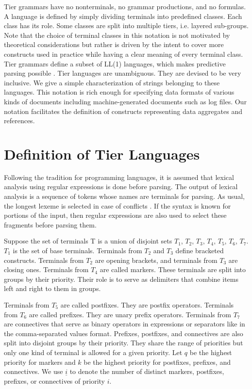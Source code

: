 \documentclass{llncs}
\begin{document}
Tier grammars have no nonterminals, no grammar productions, and no formulas. A language is defined by simply dividing terminals into predefined classes. Each class has its role. Some classes are split into multiple tiers, i.e. layered sub-groups. Note that the choice of terminal classes in this notation is not motivated by theoretical considerations but rather is driven by the intent to cover more constructs used in practice while having a clear meaning of every terminal class. Tier grammars define a subset of LL(1) languages, which makes predictive parsing possible \cite{Aho06}. Tier languages are unambiguous. They are devised to be very inclusive. We give a simple characterization of strings belonging to these languages. This notation is rich enough for specifying data formats of various kinds of documents including machine-generated documents such as log files. Our notation facilitates the definition of constructs representing data aggregates and references.  

\section{Definition of Tier Languages}

Following the tradition for programming languages, it is assumed that lexical analysis using regular expressions is done before parsing. The output of lexical analysis is a sequence of tokens whose names are terminals for parsing. As usual, the longest lexeme is selected in case of conflicts \cite{Aho06}. If the syntax is known for portions of the input, then regular expressions are also used to select these fragments before parsing them. 

Suppose the set of terminals T is a union of disjoint sets $T_1$, $T_2$, $T_3$, $T_4$, $T_5$, $T_6$, $T_7$. $T_1$ is the set of base terminals. Terminals from $T_2$ and $T_3$ define bracketed constructs. Terminals from $T_2$ are opening brackets, and terminals from $T_3$ are closing ones. Terminals from $T_4$ are called markers. These terminals are split into groups by their priority. Their role is to serve as delimiters that combine items left and right to them in groups. 

Terminals from $T_5$ are called postfixes. They are postfix operators. Terminals from $T_6$ are called prefixes. They are unary prefix operators. Terminals from $T_7$ are connectives that serve as binary operators in expressions or separators like in the comma-separated values format. Prefixes, postfixes, and connectives are also split into disjoint groups by their priority. They share the range of priorities but only one kind of terminal is allowed for a given priority. Let $q$ be the highest priority for markers and $k$ be the highest priority for postfixes, prefixes, and connectives. We use $\underline i$ to denote the number of distinct markers, postfixes, prefixes, or connectives of priority $i$.
\end{document}
